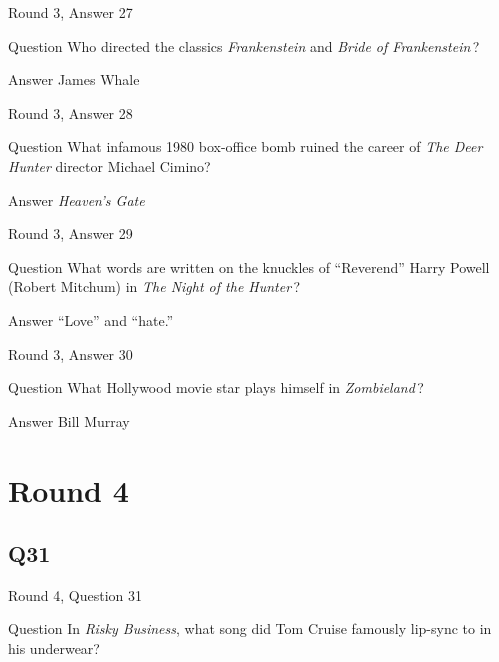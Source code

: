 \documentclass[11pt]{beamer}
\begin{document}
\begin{frame}[t]{Round 3, Answer 27}
\vspace{2em}
\begin{block}{Question}
Who directed the classics \emph{Frankenstein} and \emph{Bride of Frankenstein}\,?
\end{block}
\pause{}
\begin{block}{Answer}
James Whale
\end{block}
\end{frame}
    

\begin{frame}[t]{Round 3, Answer 28}
\vspace{2em}
\begin{block}{Question}
What infamous 1980 box-office bomb ruined the career of \emph{The Deer Hunter} director Michael Cimino?
\end{block}
\pause{}
\begin{block}{Answer}
\emph{Heaven's Gate}
\end{block}
\end{frame}
    

\begin{frame}[t]{Round 3, Answer 29}
\vspace{2em}
\begin{block}{Question}
What words are written on the knuckles of ``Reverend'' Harry Powell (Robert Mitchum) in \emph{The Night of the Hunter}\,?
\end{block}
\pause{}
\begin{block}{Answer}
``Love'' and ``hate.''
\end{block}
\end{frame}
    

\begin{frame}[t]{Round 3, Answer 30}
\vspace{2em}
\begin{block}{Question}
What Hollywood movie star plays himself in \emph{Zombieland}\,?
\end{block}
\pause{}
\begin{block}{Answer}
Bill Murray
\end{block}
\end{frame}
    

\section{Round 4}
    

\subsection*{Q31}
\begin{frame}[t]{Round 4, Question 31}
\vspace{2em}
\begin{block}{Question}
In \emph{Risky Business}, what song did Tom Cruise famously lip-sync to in his underwear?
\end{block}
\end{frame}
    
\end{document}
